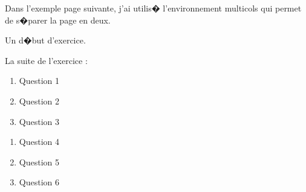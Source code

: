 \documentclass[ams,openany,10pt,presentation,latin1]{mathbook}
\begin{document}
\medskip

Dans l'exemple page suivante, j'ai utilis� l'environnement \og multicols \fg{} qui permet de s�parer la page en deux.

\exostart[1]

\setlength{\columnseprule}{1pt}

\begin{multicols}{2}
\begin{exercice}
\lipsum[1]
\end{exercice}

\begin{exercice}
\lipsum[2]
\end{exercice}

\begin{exercice}
Un d�but d'exercice.\par
La suite de l'exercice :

\begin{enumerate}
\item Question 1
\item Question 2
\item Question 3
\end{enumerate}
\end{exercice}

\columnbreak

\begin{exercice}[1]
\begin{enumerate}[start=4]
\item Question 4
\item Question 5
\item Question 6
\end{enumerate}
\end{exercice}


\end{multicols}
\end{document}
